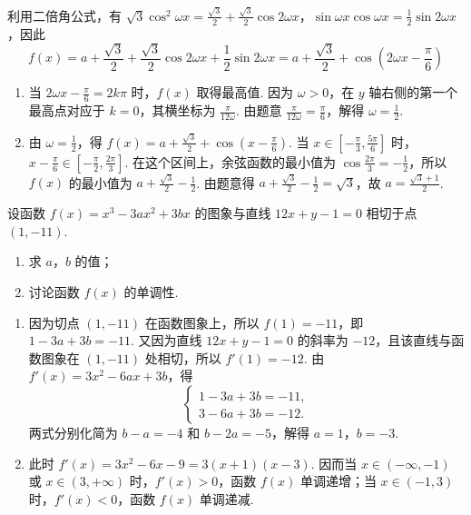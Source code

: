\begin{solution}
利用二倍角公式，有 \(\sqrt{3}\cos^2\omega x=\frac{\sqrt{3}}{2}+\frac{\sqrt{3}}{2}\cos 2\omega x\)，\(\sin\omega x\cos\omega x=\frac{1}{2}\sin 2\omega x\)，因此
\[
f(x)=a+\frac{\sqrt{3}}{2}+\frac{\sqrt{3}}{2}\cos 2\omega x+\frac{1}{2}\sin 2\omega x=a+\frac{\sqrt{3}}{2}+\cos\left(2\omega x-\frac{\pi}{6}\right)
\]

\begin{enumerate}
\item 当 \(2\omega x-\frac{\pi}{6}=2k\pi\) 时，\(f(x)\) 取得最高值. 因为 \(\omega>0\)，在 \(y\) 轴右侧的第一个最高点对应于 \(k=0\)，其横坐标为 \(\frac{\pi}{12\omega}\). 由题意 \(\frac{\pi}{12\omega}=\frac{\pi}{6}\)，解得 \(\omega=\frac{1}{2}\).
\item 由 \(\omega=\frac{1}{2}\)，得 \(f(x)=a+\frac{\sqrt{3}}{2}+\cos\left(x-\frac{\pi}{6}\right)\). 当 \(x\in\left[-\frac{\pi}{3},\frac{5\pi}{6}\right]\) 时，\(x-\frac{\pi}{6}\in\left[-\frac{\pi}{2},\frac{2\pi}{3}\right]\). 在这个区间上，余弦函数的最小值为 \(\cos\frac{2\pi}{3}=-\frac{1}{2}\)，所以 \(f(x)\) 的最小值为 \(a+\frac{\sqrt{3}}{2}-\frac{1}{2}\). 由题意得 \(a+\frac{\sqrt{3}}{2}-\frac{1}{2}=\sqrt{3}\)，故 \(a=\frac{\sqrt{3}+1}{2}\).
\end{enumerate}
\end{solution}

\begin{problem}
设函数 \( f(x) = x^3 - 3ax^2 + 3bx \) 的图象与直线 \( 12x + y - 1 = 0 \) 相切于点 \((1,-11)\).

\begin{enumerate}
\item 求 \(a\)，\(b\) 的值；
\item 讨论函数 \( f(x) \) 的单调性.
\end{enumerate}
\end{problem}

\begin{solution}
\begin{enumerate}
\item 因为切点 \(\left(1,-11\right)\) 在函数图象上，所以 \(f(1)=-11\)，即 \(1-3a+3b=-11\). 又因为直线 \(12x+y-1=0\) 的斜率为 \(-12\)，且该直线与函数图象在 \(\left(1,-11\right)\) 处相切，所以 \(f'(1)=-12\). 由 \(f'(x)=3x^2-6ax+3b\)，得
\[
\begin{cases}
1-3a+3b=-11,\\
3-6a+3b=-12.
\end{cases}
\]
两式分别化简为 \(b-a=-4\) 和 \(b-2a=-5\)，解得 \(a=1\)，\(b=-3\).
\item 此时 \(f'(x)=3x^2-6x-9=3(x+1)(x-3)\). 因而当 \(x\in(-\infty,-1)\) 或 \(x\in(3,+\infty)\) 时，\(f'(x)>0\)，函数 \(f(x)\) 单调递增；当 \(x\in(-1,3)\) 时，\(f'(x)<0\)，函数 \(f(x)\) 单调递减.
\end{enumerate}
\end{solution}

